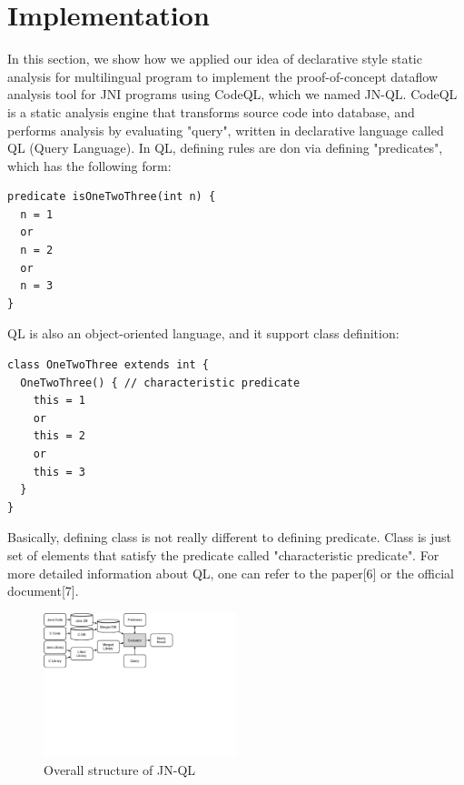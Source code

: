\section{Implementation}\label{sec:impl}
In this section, we show how we applied our idea of declarative style static
analysis for multilingual program to implement the proof-of-concept dataflow
analysis tool for JNI programs using CodeQL, which we named JN-QL. CodeQL is a
static analysis engine that transforms source code into database, and performs
analysis by evaluating "query", written in declarative language called QL
(Query Language). In QL, defining rules are don via defining "predicates",
which has the following form:
\begin{lstlisting}[style=codeql,xleftmargin=2.5em]
predicate isOneTwoThree(int n) {
  n = 1
  or
  n = 2
  or
  n = 3
}
\end{lstlisting}

QL is also an object-oriented language, and it support class definition:
\begin{lstlisting}[style=codeql,xleftmargin=2.5em]
class OneTwoThree extends int {
  OneTwoThree() { // characteristic predicate
    this = 1
    or
    this = 2
    or
    this = 3
  }
}
\end{lstlisting}

Basically, defining class is not really different to defining predicate.  Class
is just set of elements that satisfy the predicate called "characteristic
predicate". For more detailed information about QL, one can refer to the
paper[6] or the official document[7].

\begin{figure}[t]
  \centering
  \vspace{2mm}
  \includegraphics[width=0.5\textwidth]{img/codeql}
  \vspace*{-1.5em}
  \caption{Overall structure of JN-QL}
  \label{fig:codeql}
\vspace*{-.5em}
\end{figure}

